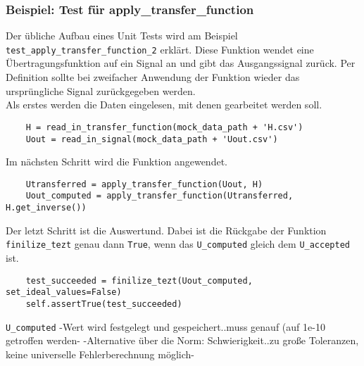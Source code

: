 \documentclass[../Report.tex]{subfiles}
\begin{document}
\subsubsection{Beispiel: Test für apply\_transfer\_function}
\label{subsubsec.code.tdd.example}
Der übliche Aufbau eines Unit Tests wird am Beispiel \lstinline{test_apply_transfer_function_2} erklärt. Diese Funktion wendet eine Übertragungsfunktion auf ein Signal an und gibt das Ausgangssignal zurück. Per Definition sollte bei zweifacher Anwendung der Funktion wieder das ursprüngliche Signal zurückgegeben werden.\\
Als erstes werden die Daten eingelesen, mit denen gearbeitet werden soll.
\lstset{language=Python}
\begin{lstlisting}
	H = read_in_transfer_function(mock_data_path + 'H.csv')
	Uout = read_in_signal(mock_data_path + 'Uout.csv')	
\end{lstlisting}
Im nächsten Schritt wird die Funktion angewendet.
\lstset{language=Python}
\begin{lstlisting}
	Utransferred = apply_transfer_function(Uout, H)
	Uout_computed = apply_transfer_function(Utransferred, H.get_inverse())	
\end{lstlisting}
Der letzt Schritt ist die Auswertund. Dabei ist die Rückgabe der Funktion \lstinline{finilize_tezt} genau dann \lstinline{True}, wenn das \lstinline{U_computed} gleich dem \lstinline{U_accepted} ist.
\lstset{language=Python}
\begin{lstlisting}
	test_succeeded = finilize_tezt(Uout_computed, set_ideal_values=False)
	self.assertTrue(test_succeeded)
\end{lstlisting}
\lstinline{U_computed} -Wert wird festgelegt und gespeichert..muss genauf (auf 1e-10 getroffen werden-
-Alternative über die Norm: Schwierigkeit..zu große Toleranzen, keine universelle Fehlerberechnung möglich-
\end{document}
